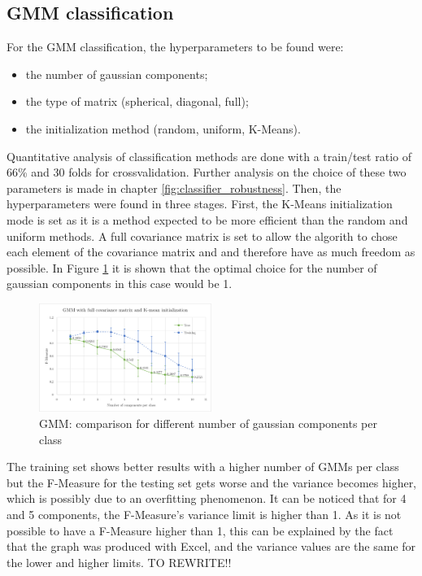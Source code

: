 \documentclass[a4paper,10pt]{article}
\begin{document}
\subsection{GMM classification}
For the GMM classification, the hyperparameters to be found were:

\begin{itemize}
  \item the number of gaussian components;
  \item the type of matrix (spherical, diagonal, full);
  \item the initialization method (random, uniform, K-Means).
\end{itemize}

 
 Quantitative analysis of classification methods are done with a train/test ratio of 66\% and 30 folds for crossvalidation. Further analysis on the choice of these two parameters is made in chapter \ref{fig:classifier_robustness}. Then, the hyperparameters were found in three stages. First, the K-Means initialization mode is set as it is a method expected to be more efficient than the random and uniform methods. A full covariance matrix is set to allow the algorith to chose each element of the covariance matrix and and therefore have as much freedom as possible. In Figure \ref{fig:GMM_graph_1} it is shown that the optimal choice for the number of gaussian components in this case would be 1.\\


\begin{figure}[H]
	\centering
	\includegraphics[width=0.5\textwidth]{pictures/GMM_graph_1}
	\caption{GMM: comparison for different number of gaussian components per class}
	\label{fig:GMM_graph_1}
\end{figure}

The training set shows better results with a higher number of GMMs per class but the F-Measure for the testing set gets worse and the variance becomes higher, which is possibly due to an overfitting phenomenon.
It can be noticed that for 4 and 5 components, the F-Measure's variance limit is higher than 1. As it is not possible to have a F-Measure higher than 1, this can be explained by the fact that the graph was produced with Excel, and the variance values are the same for the lower and higher limits.
TO REWRITE!!
\end{document}
